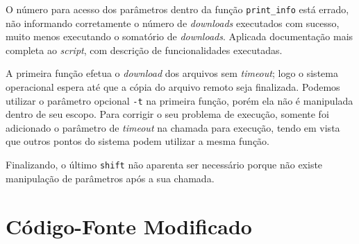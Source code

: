 \documentclass{article}
\begin{document}
O número para acesso dos parâmetros dentro da função \texttt{print\_info} está
errado, não informando corretamente o número de \textit{downloads} executados
com sucesso, muito menos executando o somatório de \textit{downloads}. Aplicada
documentação mais completa ao \textit{script}, com descrição de funcionalidades
executadas.

A primeira função efetua o \textit{download} dos arquivos sem \textit{timeout};
logo o sistema operacional espera até que a cópia do arquivo remoto seja
finalizada. Podemos utilizar o parâmetro opcional \texttt{-t} na primeira
função, porém ela não é manipulada dentro de seu escopo. Para corrigir o seu
problema de execução, somente foi adicionado o parâmetro de \textit{timeout} na
chamada para execução, tendo em vista que outros pontos do sistema podem
utilizar a mesma função.

Finalizando, o último \texttt{shift} não aparenta ser necessário porque não
existe manipulação de parâmetros após a sua chamada.

\section{Código-Fonte Modificado}
\end{document}

